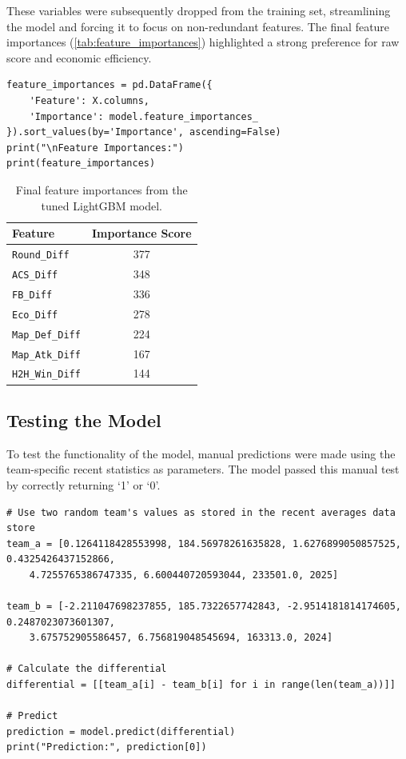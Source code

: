 These variables were subsequently dropped from the training set, streamlining the model and forcing it to focus on non-redundant features. The final feature importances (\autoref{tab:feature_importances}) highlighted a strong preference for raw score and economic efficiency.

\begin{lstlisting}[style=code, caption={Feature importance extraction from the tuned LightGBM model.}]
feature_importances = pd.DataFrame({
    'Feature': X.columns,
    'Importance': model.feature_importances_
}).sort_values(by='Importance', ascending=False)
print("\nFeature Importances:")
print(feature_importances)
\end{lstlisting}

\begin{table}[H]
    \centering
    \small
    \begin{tabular}{l c}
        \toprule
        \textbf{Feature} & \textbf{Importance Score} \\
        \midrule
        \texttt{Round\_Diff} & 377 \\
        \midrule
        \texttt{ACS\_Diff} & 348 \\
        \midrule
        \texttt{FB\_Diff} & 336 \\
        \midrule
        \texttt{Eco\_Diff} & 278 \\
        \midrule
        \texttt{Map\_Def\_Diff} & 224 \\
        \midrule
        \texttt{Map\_Atk\_Diff} & 167 \\
        \midrule
        \texttt{H2H\_Win\_Diff} & 144 \\
        \bottomrule
    \end{tabular}
    \caption{Final feature importances from the tuned LightGBM model.}
    \label{tab:feature_importances}
\end{table}

\subsection{Testing the Model}
To test the functionality of the model, manual predictions were made using the team-specific recent statistics as parameters. The model passed this manual test by correctly returning `1' or `0'.

\begin{lstlisting}[style=code, caption={Manual prediction test using recent team statistics.}, label={lst:manual_prediction_test}]
# Use two random team's values as stored in the recent averages data store
team_a = [0.1264118428553998, 184.56978261635828, 1.6276899050857525, 0.4325426437152866,
    4.7255765386747335, 6.600440720593044, 233501.0, 2025]

team_b = [-2.211047698237855, 185.7322657742843, -2.9514181814174605, 0.2487023073601307,
    3.675752905586457, 6.756819048545694, 163313.0, 2024]

# Calculate the differential
differential = [[team_a[i] - team_b[i] for i in range(len(team_a))]]

# Predict
prediction = model.predict(differential)
print("Prediction:", prediction[0])
\end{lstlisting}

